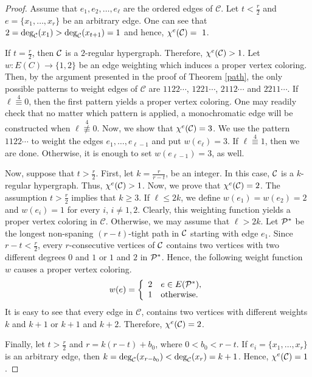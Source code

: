 \documentclass[12pt,a4paper]{article}
\begin{document}
\begin{proof}
	Assume that $e_1,e_2,\ldots, e_{\ell}$ are the ordered edges of  $\mathcal{C}$.
	Let $ t<\frac{r}{2} $ and $ e=\{x_1,\ldots, x_r\} $  be an arbitrary edge. One can see that $ 2=\deg_{{\cal C}}(x_{1})>\deg_{{\cal C}}(x_{t+1})=1 $ and hence, $ \chi^e({{\cal C}})=~1 $.
	
	If  $ t=\frac{r}{2} $, then  $  {\cal C}$ is a $ 2$-regular hypergraph. Therefore, $ \chi^e({\cal C})>1 $.
	Let $ w:E(C)\rightarrow\{1,2\} $ be an edge weighting which induces a proper vertex coloring. Then, by the argument presented in the proof of Theorem \ref{path}, the only possible patterns to weight edges of  $\mathcal{C}$ are $ 1122\cdots $, $ 1221\cdots $, $ 2112\cdots $ and $ 2211\cdots $.
	If $ \ell\overset{4}{\equiv}0 $, then the first pattern yields a proper vertex coloring. One may readily check that no matter which pattern is applied, a monochromatic edge will be constructed when $ \ell\overset{4}{\not\equiv}0 $.
	Now, we show that $ \chi^{e}({\cal C})=3 $.
	We use the pattern $ 1122\cdots $ to weight the edges $ e_1,\ldots, e_{\ell-1} $  and put $ w(e_\ell)=3. $
	If $ \ell\overset{4}{\equiv}1 $, then we are done. Otherwise,
	it is enough to set $ w(e_{\ell-1}) = 3 $, as well.
	
	Now, suppose that  $ t>\frac{r}{2} $.
	First, let  $ k=\frac{r}{r-t} $, be an integer.
	In this case,
	$ {\cal C}$ is a $ k$-regular hypergraph.
	Thus,  $  \chi^e({\cal C})>1  $. Now, we prove that $  \chi^e({\cal C})=2  $. The assumption $ t>\frac{r}{2} $ implies that $ k\geq3 $.
	If $ \ell \leq 2k$, we define $w(e_1)=w(e_2)=2$ and $w(e_i)=1$ for every $i$, $i \neq 1,2$. Clearly, this weighting function yields a proper vertex coloring in $\mathcal{C}$.
	Otherwise, we may assume that $ \ell > 2k$.  Let $ {\cal P}^* $ be the longest non-spaning  $ (r-t)$-tight path in $ {\cal C}$ starting with edge $e_1$.
	Since
	$ r-t<\frac{r}{2} $, every $r$-consecutive vertices of  $ {\cal C}$ contains   two vertices with two different degrees $0$ and $1$  or $1$ and $2$ in $ {\cal P}^* $. Hence, the following weight function $ w $ causes a proper vertex coloring.
	\begin{equation*}
	w(e)=
	\left\{
	\begin{array}{cl}
	2 &e \in  E({\cal P}^*), \\
	1 & \text{otherwise.}
	\end{array}
	\right.
	\end{equation*}
	It is easy to see that every edge in $\mathcal{C}$, contains two vertices with different weights $k$ and $k+1$ or $k+1$ and $k+2$.
	Therefore,
	$  \chi^e({\cal C})=2  $.
	
	Finally, let $t> \frac{r}{2}$ and $ r=k(r-t)+b_0 $, where $ 0<b_0<r-t $. If  $ e_i=\{x_1,\ldots, x_r\} $  is an arbitrary edge, then $ k=\deg_{\cal C}(x_{r-b_0})<\deg_{\cal C}(x_{r})=k+1 $. Hence, $ \chi^e({\cal C})=1 $.
\end{proof}
\end{document}
